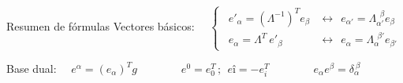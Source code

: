 \begin{myexampleblock}{Resumen de fórmulas}
\vspace{2mm} Vectores básicos: $\quad \begin{cases}
 	\ \ e'_\alpha = (\Lambda^{-1})^T e_\beta &\leftrightarrow \ \ e_{\alpha'}=\Lambda_{\alpha'}^{\ \ \beta} e_\beta \\ 
 	\ \ e_\alpha=\Lambda^T\ e'_{\beta}  &\leftrightarrow \ \ e_\alpha=\Lambda_\alpha^{\ \ \beta'} e_{\beta'}
  \end{cases}$


\vspace{2mm} Base dual: $\quad e^\alpha=(e_\alpha)^T g \qquad \qquad e^0=e_0^T\, ; \ \ eî=-e_i^T \qquad \qquad e_\alpha e^\beta = \delta_\alpha^{\ \beta}$ 

\vspace{2mm} 

\end{myexampleblock}



